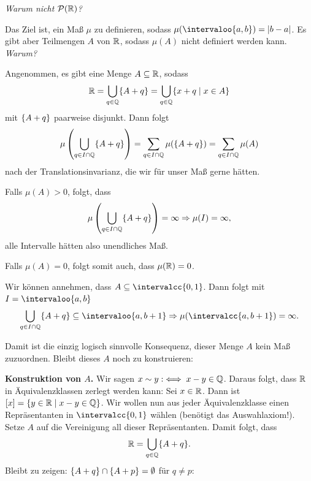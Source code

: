 \documentclass[language=ngerman]{../../Template/TemplateLecture}
\begin{document}
\emph{Warum nicht $\mathcal{P}(\mathbb{R})$?}

Das Ziel ist, ein Maß $\mu$ zu definieren, sodass $\mu(\intervaloo{a,b}) = \abs{b - a}$. Es gibt aber Teilmengen $A$ von $\mathbb{R}$, sodass $\mu(A)$ nicht definiert werden kann. \emph{Warum?}

Angenommen, es gibt eine Menge $A \subseteq \mathbb{R}$, sodass
\begin{equation}
    \mathbb{R} = \bigcup_{q \in \mathbb{Q}} \{A + q\} = \bigcup_{q \in \mathbb{Q}} \{x + q \mid x \in A\}
\end{equation}
mit $\{A + q\}$ paarweise disjunkt. Dann folgt
\begin{equation}
    \mu\left(\bigcup_{q \in I \cap \mathbb{Q}} \{A + q\}\right) = \sum_{q \in I \cap \mathbb{Q}} \mu(\{A + q\}) = \sum_{q \in I \cap \mathbb{Q}} \mu(A)
\end{equation}
nach der Translationsinvarianz, die wir für unser Maß gerne hätten.

Falls $\mu(A) > 0$, folgt, dass
\begin{equation}
    \mu\left(\bigcup_{q \in I \cap \mathbb{Q}} \{A + q\}\right) = \infty \Rightarrow \mu(I) = \infty,
\end{equation}
alle Intervalle hätten also unendliches Maß.

Falls $\mu(A) = 0$, folgt somit auch, dass $\mu(\mathbb{R}) = 0$.

Wir können annehmen, dass $A \subseteq \intervalcc{0,1}$. Dann folgt mit $I = \intervaloo{a,b}$
\begin{equation}
    \bigcup_{q \in I \cap \IQ} \set{A + q} \subseteq \intervaloo{a, b+1} \Rightarrow \mu(\intervalcc{a, b+1}) = \infty.
\end{equation}

Damit ist die einzig logisch sinnvolle Konsequenz, dieser Menge $A$ kein Maß zuzuordnen. Bleibt dieses $A$ noch zu konstruieren:

\textbf{Konstruktion von $A$.} Wir sagen $x \sim y :\iff x - y \in \mathbb{Q}$. Daraus folgt, dass $\mathbb{R}$ in Äquivalenzklassen zerlegt werden kann: Sei $x \in \mathbb{R}$. Dann ist $[x] = \{y \in \mathbb{R} \mid x - y \in \mathbb{Q}\}$. Wir wollen nun aus jeder Äquivalenzklasse einen Repräsentanten in $\intervalcc{0,1}$ wählen (benötigt das Auswahlaxiom!). Setze $A$ auf die Vereinigung all dieser Repräsentanten. Damit folgt, dass 
\begin{equation}
    \mathbb{R} = \bigcup_{q \in \mathbb{Q}} \{A + q\}.
\end{equation}
Bleibt zu zeigen: $\{A + q\} \cap \{A + p\} = \emptyset$ für $q \neq p$:
\end{document}
